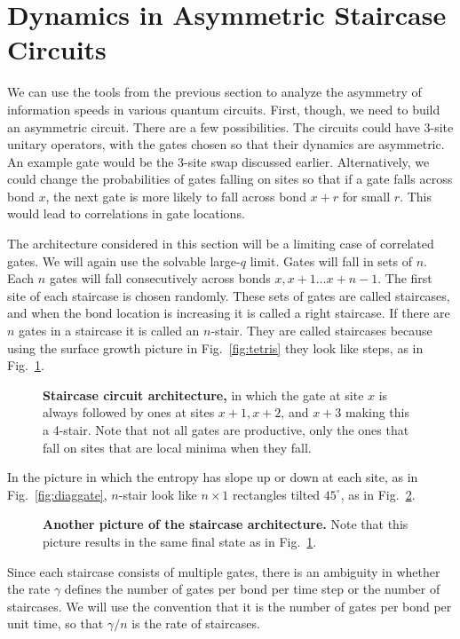\section{Dynamics in Asymmetric Staircase Circuits} \label{sec:stairs}

We can use the tools from the previous section to analyze the asymmetry of information speeds in various quantum circuits. First, though, we need to build an asymmetric circuit. There are a few possibilities. The circuits could have 3-site unitary operators, with the gates chosen so that their dynamics are asymmetric. An example gate would be the 3-site swap discussed earlier. Alternatively, we could change the probabilities of gates falling on sites so that if a gate falls across bond $x$, the next gate is more likely to fall across bond $x+r$ for small $r$. This would lead to correlations in gate locations.

The architecture considered in this section will be a limiting case of correlated gates. We will again use the solvable large-$q$ limit. Gates will fall in sets of $n$. Each $n$ gates will fall consecutively across bonds $x, x+1\dots x+n-1$. The first site of each staircase is chosen randomly. These sets of gates are called staircases, and when the bond location is increasing it is called a right staircase. If there are $n$ gates in a staircase it is called an $n$-stair. They are called staircases because using the surface growth picture in Fig.~\ref{fig:tetris} they look like steps, as in Fig.~\ref{fig:stairs}. 
\begin{figure}
	\centering
	
	\caption{\textbf{Staircase circuit architecture,} in which the gate at site $x$ is always followed by ones at sites $x+1, x+2$, and $x+3$ making this a 4-stair. Note that not all gates are productive, only the ones that fall on sites that are local minima when they fall.}
	\label{fig:stairs}
\end{figure}
In the picture in which the entropy has slope up or down at each site, as in Fig.~\ref{fig:diaggate}, $n$-stair look like $n\times 1$ rectangles tilted $45^\circ$, as in Fig.~\ref{fig:diagstairs}.
\begin{figure}
	\centering
	
	\caption{\textbf{Another picture of the staircase architecture.} Note that this picture results in the same final state as in Fig.~\ref{fig:stairs}.}
	\label{fig:diagstairs}
\end{figure}
Since each staircase consists of multiple gates, there is an ambiguity in whether the rate $\gamma$ defines the number of gates per bond per time step or the number of staircases. We will use the convention that it is the number of gates per bond per unit time, so that $\gamma/n$ is the rate of staircases.

